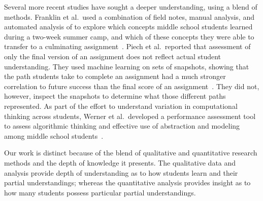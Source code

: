 Several more recent studies have sought a deeper understanding, using a blend
of methods. Franklin et al.\ used a combination of field notes, manual
analysis, and automated analysis of  to explore which concepts
middle school students learned during a two-week summer camp, and which of
these concepts they were able to transfer to a culminating
assignment~\cite{Boe:2013:HLS:2445196.2445265, Franklin:2013:SBO}. Piech et
al.\ reported that assessment of only the final version of an assignment does
not reflect actual student understanding. They used machine learning on sets of
snapshots, showing that the path students take to complete an assignment had a
much stronger correlation to future success than the final score of an
assignment~\cite{Piech:2012:MSL:2157136.2157182}. They did not, however,
inspect the snapshots to determine what those different paths represented. As
part of the effort to understand variation in computational thinking across
students, Werner et al.\ developed a performance assessment tool to assess
algorithmic thinking and effective use of abstraction and modeling among middle
school students~\cite{Werner:2012:FPA:2157136.2157200}.

Our work is distinct because of the blend of qualitative and quantitative
research methods and the depth of knowledge it presents. The qualitative data
and analysis provide depth of understanding as to how students learn and their
partial understandings; whereas the quantitative analysis provides insight as
to how many students possess particular partial understandings.
